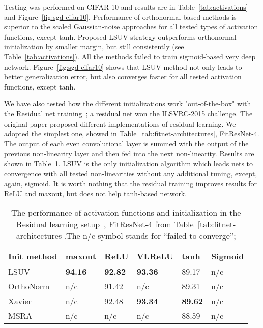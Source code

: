 \documentclass{article} \clearpage{}\usepackage{iclr2016_conference,times}
\begin{document}
Testing was performed on CIFAR-10 and results are in Table~\ref{tab:activations} and Figure~\ref{fig:sgd-cifar10}. Performance of orthonormal-based methods is superior to the scaled Gaussian-noise approaches for all tested types of activation functions, except tanh. Proposed LSUV strategy outperforms orthonormal initialization by smaller margin, but still consistently (see Table~\ref{tab:activations}). All the methods failed to train sigmoid-based very deep network. 
Figure~\ref{fig:sgd-cifar10} shows that LSUV method not only leads to better generalization error, but also converges faster for all tested activation functions, except tanh.


We have also tested how the different initializations work "out-of-the-box" with the  Residual net training~\cite{DeepResNet2015}; a residual net won the ILSVRC-2015 challenge. The original paper proposed different implementations of residual learning. We adopted the simplest one, showed in Table~\ref{tab:fitnet-architectures}, FitResNet-4. The output of each even convolutional layer is summed with the output of the previous non-linearity layer and then fed into the next non-linearity. Results are shown in Table~\ref{tab:activations-resnet}. LSUV is the only initialization algorithm which leads nets to convergence with all tested non-linearities without any additional tuning, except, again, sigmoid. 
It is worth nothing that the residual training improves results for ReLU and maxout, but does not help tanh-based network. 
\begin{table}[htb]
\caption{The performance of activation functions and initialization in the Residual learning setup~\cite{DeepResNet2015}, FitResNet-4 from Table~\ref{tab:fitnet-architectures}.The n/c symbol stands for ``failed to converge'';}
\label{tab:activations-resnet}
\centering
\begin{tabular}{llllll}
\hline
Init method & maxout & ReLU  & VLReLU & tanh & Sigmoid \\
\hline
LSUV           & \textbf{94.16} & \textbf{92.82} &  \textbf{93.36}& 89.17& n/c \\
OrthoNorm      & n/c  & 91.42    & n/c          & 89.31 & n/c \\
Xavier         & n/c  & 92.48    & \textbf{93.34} & \textbf{89.62} & n/c \\
MSRA           & n/c   & n/c     & n/c   & 88.59 & n/c \\
\hline
\end{tabular}
\end{table}
\end{document}
